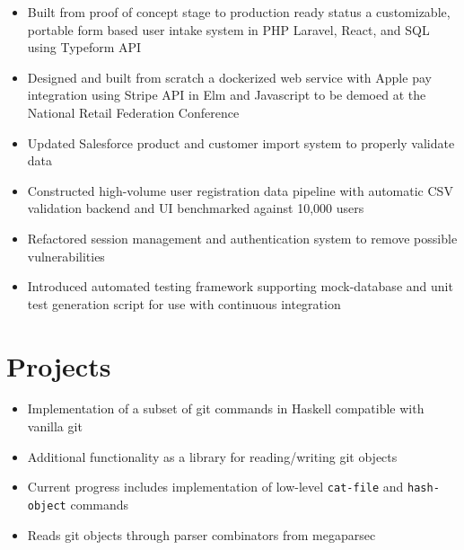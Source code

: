 \documentclass{simple_resume}
\begin{document}
\begin{itemize}
  \item{Built from proof of concept stage to production ready status a customizable, portable form based user intake system in PHP Laravel, React, and SQL using Typeform API}
  \item{Designed and built from scratch a dockerized web service with Apple pay integration using Stripe API in Elm and Javascript to be demoed at the National Retail Federation Conference}
  \item{Updated Salesforce product and customer import system to properly validate data}
\end{itemize}


\begin{itemize}
  \item{Constructed high-volume user registration data pipeline with automatic CSV validation backend and UI benchmarked against 10,000 users}
  \item{Refactored session management and authentication system to remove possible vulnerabilities}
  \item{Introduced automated testing framework supporting mock-database and unit test generation script for use with continuous integration}
\end{itemize}

\section{Projects}
\begin{itemize}
  \item Implementation of a subset of git commands in Haskell compatible with vanilla git
  \item Additional functionality as a library for reading/writing git objects
  \item Current progress includes implementation of low-level \verb|cat-file| and \verb|hash-object| commands
  \item Reads git objects through parser combinators from megaparsec
\end{itemize}
\end{document}
